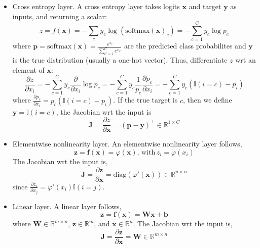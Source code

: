 \documentclass[11pt]{article}
\begin{document}
\begin{itemize}
    \item Cross entropy layer. A cross entropy layer takes logits $\boldsymbol{x}$ and target $\boldsymbol{y}$ as inputs, and returning a scalar:
    \[
    z = f(\boldsymbol{x}) = -\sum_c y_c \log(\text{softmax}(\boldsymbol{x})_c) = -\sum_{c=1}^C y_c \log p_c
    \] 
    where $\boldsymbol{p} = \text{softmax}(\boldsymbol{x}) = \frac{e^{x_c}}{\sum_{c'=1}^C e^{x_{c'}}}$ are the predicted class probabilites
    and $\boldsymbol{y}$ is the true distribution (usually a one-hot vector). Thus, differentiate $z$ wrt an element of $\boldsymbol{x}$:
    \[
    \frac{\partial z}{\partial x_i} = -\sum_{c=1}^C y_{c} \frac{\partial}{\partial x_i} \log p_{c} = -\sum_{c=1}^C y_{c} \frac{1}{p_{c}} \frac{\partial p_{c}}{\partial x_i}
    = -\sum_{c=1}^C y_{c} (\mathbb{I}(i=c) - p_i)
    \]
    where $\frac{\partial p_{c}}{\partial x_i} = p_{c}(\mathbb{I}(i=c) - p_i)$. If the true target is $c$, then we define $\boldsymbol{y} = \mathbb{I}(i=c)$, the Jacobian wrt the input is
    \[
    \boldsymbol{J} = \frac{\partial z}{\partial \boldsymbol{x}} = (\boldsymbol{p} - \boldsymbol{y})^\top \in \mathbb{R}^{1 \times C}
    \]
    \item Elementwise nonlinearity layer. An elementwise nonlinearity layer follows,
    \[
    \boldsymbol{z} = \boldsymbol{f}(\boldsymbol{x}) = \varphi(\boldsymbol{x}), \, \text{with} \, z_i = \varphi(x_i)
    \]
    The Jacobian wrt the input is,
    \[
    \boldsymbol{J} = \frac{\partial \boldsymbol{z}}{\partial \boldsymbol{x}} = \text{diag}(\varphi'(\boldsymbol{x})) \in \mathbb{R}^{n \times n}
    \]
    since $\frac{\partial z_i}{\partial x_j} = \varphi'(x_i) \mathbb{I}(i=j)$.
    \item Linear layer. A linear layer follows,
    \[
    \boldsymbol{z} = \boldsymbol{f}(\boldsymbol{x}) = \boldsymbol{W} \boldsymbol{x} + \boldsymbol{b}
    \]
    where $\boldsymbol{W} \in \mathbb{R}^{m \times n}$, $\boldsymbol{z} \in \mathbb{R}^m$, and $\boldsymbol{x} \in \mathbb{R}^n$.
    The Jacobian wrt the input is,
    \[
    \boldsymbol{J} = \frac{\partial \boldsymbol{z}}{\partial \boldsymbol{x}} = \boldsymbol{W} \in \mathbb{R}^{m \times n}
    \]


\end{itemize}
\end{document}
